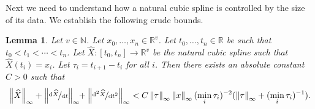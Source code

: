 \documentclass{article}
\theoremstyle{plain}
\newtheorem{lemma}[thm]{Lemma}
\theoremstyle{definition}
\newcommand{\norm}[1]{\left\|#1\right\|}
\newcommand{\reals}{\mathbb{R}}
\newcommand{\naturals}{\mathbb{N}}
\newcommand{\ttfrac}[2]{\nicefrac{#1}{#2}}
\begin{document}
	Next we need to understand how a natural cubic spline is controlled by the size of its data. We establish the following crude bounds.
	
	\begin{lemma}\label{lemma:spline-bound}
	Let $v \in \naturals $. Let $x_0, \ldots, x_n \in \reals^v$. Let $t_0, \ldots, t_n \in \reals$ be such that $t_0 < t_1 < \cdots < t_n$. Let $\widehat{X} \colon [t_0, t_n] \to \reals^v$ be the natural cubic spline such that $\widehat{X}(t_i) = x_i$. Let $\tau_i = t_{i + 1} - t_i$ for all $i$. Then there exists an absolute constant $C > 0$ such that
	\begin{equation*}
	\norm{\widehat{X}}_\infty + \norm{\ttfrac{\mathrm{d}\widehat{X}}{\mathrm{d}t}}_\infty \!\!+ \norm{\ttfrac{\mathrm{d}^2\widehat{X}}{\mathrm{d}t^2}}_\infty < C \norm{\tau}_\infty \norm{x}_\infty (\min_i \tau_i)^{-2} (\norm{\tau}_\infty + (\min_i \tau_i)^{-1}).
	\end{equation*}
	\end{lemma}
\end{document}

